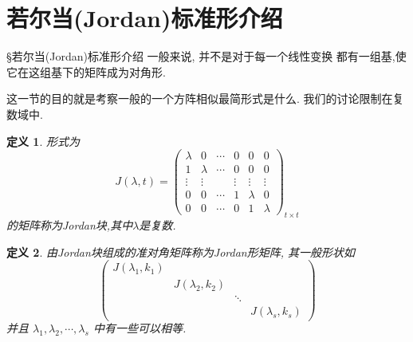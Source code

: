 \documentclass[13pt]{beamer}
\newtheorem*{defi}{定义}
\begin{document}
\section{若尔当(Jordan)标准形介绍}
\begin{frame}{\S 若尔当(Jordan)标准形介绍}
一般来说, 并不是对于每一个线性变换 都有一组基,使它在这组基下的矩阵成为对角形.

这一节的目的就是考察一般的一个方阵相似最简形式是什么. 我们的讨论限制在\alert{复数域}中.
\begin{defi}
形式为
\[
{J}(\lambda, t)=
\left(\begin{array}{cccccc}
\lambda & 0 & \cdots & 0 & 0 & 0 \\
1 & \lambda & \cdots & 0 & 0 & 0 \\
\vdots & \vdots & & \vdots & \vdots & \vdots \\
0 & 0 & \cdots & 1 & \lambda & 0 \\
0 & 0 & \cdots & 0 & 1 & \lambda
\end{array}\right)_{t \times t}
\]
的矩阵称为Jordan块,其中$\lambda$是复数. 

\end{defi}
\end{frame}




\begin{frame}
\begin{defi}
由Jordan块组成的准对角矩阵称为Jordan形矩阵, 其一般形状如
\[
\left(\begin{array}{cccc}
J(\lambda_{1}, k_1) & & & \\
& J(\lambda_{2}, k_2)& & \\
& & \ddots & \\
& & &J(\lambda_{s}, k_s)
\end{array}\right)
\]
并且 $\lambda_{1}, \lambda_{2}, \cdots, \lambda_s$ 中有一些可以相等.
\end{defi}

\end{frame}
\end{document}
